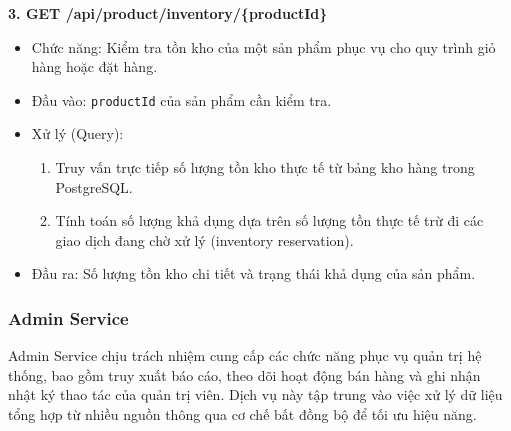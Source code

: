 \textbf{3. GET /api/product/inventory/\{productId\}}
\begin{itemize}
    \item Chức năng: Kiểm tra tồn kho của một sản phẩm phục vụ cho quy trình giỏ hàng hoặc đặt hàng.
    \item Đầu vào: \texttt{productId} của sản phẩm cần kiểm tra.
    \item Xử lý (Query):
    \begin{enumerate}
        \item Truy vấn trực tiếp số lượng tồn kho thực tế từ bảng kho hàng trong PostgreSQL.
        \item Tính toán số lượng khả dụng dựa trên số lượng tồn thực tế trừ đi các giao dịch đang chờ xử lý (inventory reservation).
    \end{enumerate}
    \item Đầu ra: Số lượng tồn kho chi tiết và trạng thái khả dụng của sản phẩm.
\end{itemize}

\subsubsection{Admin Service}

Admin Service chịu trách nhiệm cung cấp các chức năng phục vụ quản trị hệ thống, bao gồm truy xuất báo cáo, theo dõi hoạt động bán hàng và ghi nhận nhật ký thao tác của quản trị viên. Dịch vụ này tập trung vào việc xử lý dữ liệu tổng hợp từ nhiều nguồn thông qua cơ chế bất đồng bộ để tối ưu hiệu năng.

